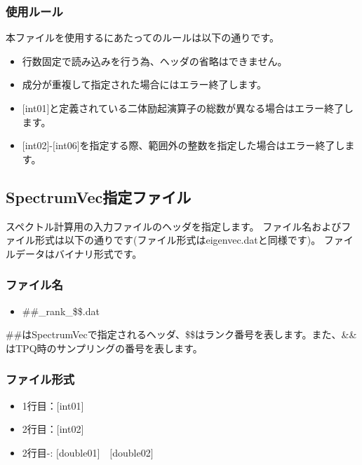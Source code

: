 \subsubsection{使用ルール}
本ファイルを使用するにあたってのルールは以下の通りです。
\begin{itemize}
\item 行数固定で読み込みを行う為、ヘッダの省略はできません。
\item 成分が重複して指定された場合にはエラー終了します。
\item $[$int01$]$と定義されている二体励起演算子の総数が異なる場合はエラー終了します。
\item $[$int02$]$-$[$int06$]$を指定する際、範囲外の整数を指定した場合はエラー終了します。
\end{itemize}

\newpage
\subsection{{SpectrumVec指定ファイル}}
\label{Subsec:spectrumvec}
スペクトル計算用の入力ファイルのヘッダを指定します。
ファイル名およびファイル形式は以下の通りです(ファイル形式はeigenvec.datと同様です)。
ファイルデータはバイナリ形式です。

\subsubsection{ファイル名}
\begin{itemize}
   \item{\#\#\_rank\_\$\$.dat}   
\end{itemize}
  \#\#はSpectrumVecで指定されるヘッダ、\$\$はランク番号を表します。また、\&\&はTPQ時のサンプリングの番号を表します。

\subsubsection{ファイル形式}
 \begin{itemize}
   \item  1行目：$[$int01$]$
   \item  2行目：$[$int02$]$
   \item  2行目-: $[$double01$]$~~$[$double02$]$
  \end{itemize}

